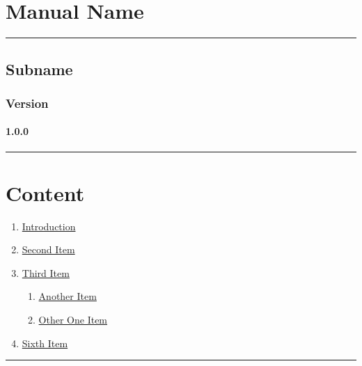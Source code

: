 \documentclass[]{article}
\date{mayo  1, 2020}
\providecommand{\tightlist}{%
  \setlength{\itemsep}{0pt}\setlength{\parskip}{0pt}}
\let\oldparagraph\paragraph
\renewcommand{\paragraph}[1]{\oldparagraph{#1}\mbox{}}
\begin{document}
\section{Manual Name}\label{manual-name}

\begin{center}\rule{0.5\linewidth}{\linethickness}\end{center}

\subsection{Subname}\label{subname}

\subsubsection{Version}\label{version}

\paragraph{1.0.0}\label{section}

\begin{center}\rule{0.5\linewidth}{\linethickness}\end{center}

\section{Content}\label{content}

\begin{enumerate}
\def\labelenumi{\arabic{enumi}.}
\tightlist
\item
  \protect\hyperlink{1}{Introduction}
\item
  \protect\hyperlink{2}{Second Item}
\item
  \protect\hyperlink{3}{Third Item}

  \begin{enumerate}
  \def\labelenumii{\arabic{enumii}.}
  \tightlist
  \item
    \protect\hyperlink{4}{Another Item}
  \item
    \protect\hyperlink{5}{Other One Item}
  \end{enumerate}
\item
  \protect\hyperlink{6}{Sixth Item}
\end{enumerate}

\begin{center}\rule{0.5\linewidth}{\linethickness}\end{center}
\end{document}
